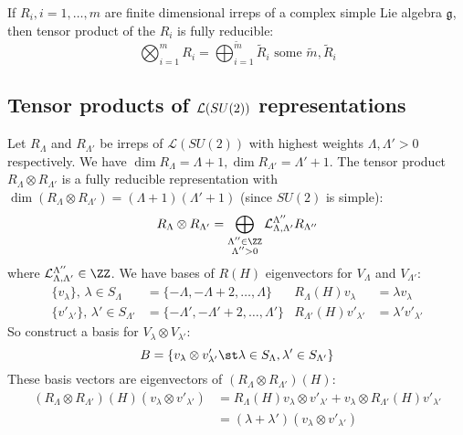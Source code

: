 \documentclass{jknotes}
\begin{document}
\begin{lemma}
    If \(R_i, i = 1,\dots,m\) are finite dimensional irreps of a complex simple Lie algebra \(\mathfrak{g}\), then tensor product of the \(R_i\) is fully reducible:
    \begin{equation}
        \bigotimes_{i=1}^m R_i = \bigoplus_{i=1}^{\tilde{m}} \tilde{R}_i \text{ some } \tilde{m}, \tilde{R}_i
    \end{equation}
\end{lemma}

\subsection{Tensor products of \texorpdfstring{${\cal L}(SU(2))$}{L(SU(2))} representations}
Let \(R_\Lambda\) and \(R_{\Lambda'}\) be irreps of \(\mathcal{L}(SU(2))\) with highest weights \(\Lambda,\Lambda'>0\) respectively. We have \(\dim R_\Lambda = \Lambda + 1, \dim R_{\Lambda'} = \Lambda' + 1\). The tensor product \(R_\Lambda\otimes R_{\Lambda'}\) is a fully reducible representation with \(\dim(R_\Lambda\otimes R_{\Lambda'}) = (\Lambda+1)(\Lambda'+1)\) (since \(SU(2)\) is simple):
\begin{equation}
    R_\Lambda \otimes R_{\Lambda'} = \bigoplus_{\substack{\Lambda''\in \ZZ\\ \Lambda'' > 0}}\mathcal{L}_{\Lambda,\Lambda'}^{\Lambda''} R_{\Lambda''}
\end{equation}
where \(\mathcal{L}_{\Lambda,\Lambda'}^{\Lambda''} \in \ZZ\). We have bases of \(R(H)\) eigenvectors for \(V_\Lambda\) and \(V_{\Lambda'}\):
\begin{align}
    \{v_\lambda\},\,\lambda\in S_\Lambda &= \{-\Lambda,-\Lambda+2,\dots,\Lambda\} & R_\Lambda(H)v_\lambda &= \lambda v_\lambda \\
    \{v'_{\lambda'}\},\,\lambda'\in S_{\Lambda'} &= \{-\Lambda',-\Lambda'+2,\dots,\Lambda'\} & R_{\Lambda'}(H)v'_{\lambda'} &= \lambda' v'_{\lambda'}
\end{align}
So construct a basis for \(V_\lambda\otimes V_{\lambda'}\):
\begin{equation}
    B = \{v_\lambda\otimes v'_{\lambda'} \st \lambda\in S_\Lambda, \lambda'\in S_{\Lambda'}\}
\end{equation}
These basis vectors are eigenvectors of \((R_\Lambda\otimes R_{\Lambda'})(H)\):
\begin{align}
    (R_\Lambda\otimes R_{\Lambda'})(H)(v_\lambda\otimes v'_{\lambda'}) &= R_\Lambda(H)v_\lambda\otimes v'_{\lambda'} + v_\lambda \otimes R_{\Lambda'}(H)v'_{\lambda'} \\
    &= (\lambda+\lambda')(v_\lambda \otimes v'_{\lambda'})
\end{align}
\end{document}
